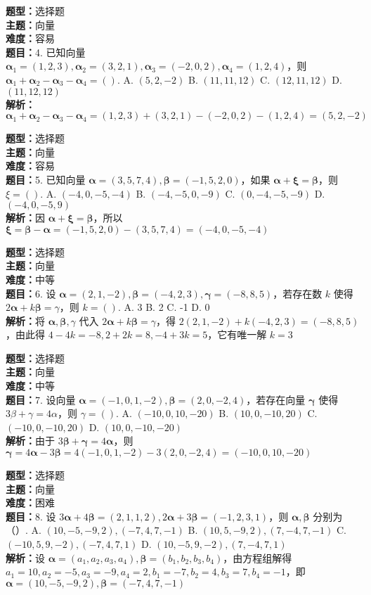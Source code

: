 \documentclass{ctexart}
\newenvironment{question}[5]{%
	\noindent\textbf{题型：}#1\\
	\textbf{主题：}#2\\
	\textbf{难度：}#3\\
	\textbf{题目：}#4\\
	\textbf{解析：}#5\\
	\vspace{1em}
}{}
\begin{document}
	\begin{question}
		{选择题}
		{向量}
		{容易}
		{4. 已知向量 \(\boldsymbol{\alpha}_1=(1,2,3), \boldsymbol{\alpha}_2=(3,2,1), \boldsymbol{\alpha}_3=(-2,0,2), \boldsymbol{\alpha}_4=(1,2,4)\)，则 \(\boldsymbol{\alpha}_1+\boldsymbol{\alpha}_2-\boldsymbol{\alpha}_3-\boldsymbol{\alpha}_4=()\). 
			A. \((5,2,-2)\)
			B. \((11,11,12)\)
			C. \((12,11,12)\)
			D. \((11,12,12)\)}
		{\(\boldsymbol{\alpha}_1+\boldsymbol{\alpha}_2-\boldsymbol{\alpha}_3-\boldsymbol{\alpha}_4=(1,2,3)+(3,2,1)-(-2,0,2)-(1,2,4)=(5,2,-2)\)}
	\end{question}
	
	\begin{question}
		{选择题}
		{向量}
		{容易}
		{5. 已知向量 \(\boldsymbol{\alpha}=(3,5,7,4), \boldsymbol{\beta}=(-1,5,2,0)\)，如果 \(\boldsymbol{\alpha}+\boldsymbol{\xi}=\boldsymbol{\beta}\)，则 \(\xi=()\). 
			A. \((-4,0,-5,-4)\)
			B. \((-4,-5,0,-9)\)
			C. \((0,-4,-5,-9)\)
			D. \((-4,0,-5,9)\)}
		{因 \(\boldsymbol{\alpha}+\boldsymbol{\xi}=\boldsymbol{\beta}\)，所以 \(\boldsymbol{\xi}=\boldsymbol{\beta}-\boldsymbol{\alpha}=(-1,5,2,0)-(3,5,7,4)=(-4,0,-5,-4)\)}
	\end{question}
	
	\begin{question}
		{选择题}
		{向量}
		{中等}
		{6. 设 \(\boldsymbol{\alpha}=(2,1,-2), \boldsymbol{\beta}=(-4,2,3), \boldsymbol{\gamma}=(-8,8,5)\)，若存在数 \(k\) 使得 \(2\boldsymbol{\alpha}+k\boldsymbol{\beta}=\gamma\)，则 \(k=()\). 
			A. 3
			B. 2
			C. -1
			D. 0}
		{将 \(\boldsymbol{\alpha}, \boldsymbol{\beta}, \gamma\) 代入 \(2\boldsymbol{\alpha}+k\boldsymbol{\beta}=\gamma\)，得 \(2(2,1,-2)+k(-4,2,3)=(-8,8,5)\)，由此得 \(4-4k=-8,2+2k=8,-4+3k=5\)，它有唯一解 \(k=3\)}
	\end{question}
	
	\begin{question}
		{选择题}
		{向量}
		{中等}
		{7. 设向量 \(\boldsymbol{\alpha}=(-1,0,1,-2), \boldsymbol{\beta}=(2,0,-2,4)\)，若存在向量 \(\boldsymbol{\gamma}\) 使得 \(3\beta+\gamma=4\alpha\)，则 \(\gamma=()\). 
			A. \((-10,0,10,-20)\)
			B. \((10,0,-10,20)\)
			C. \((-10,0,-10,20)\)
			D. \((10,0,-10,-20)\)}
		{由于 \(3\boldsymbol{\beta}+\boldsymbol{\gamma}=4\boldsymbol{\alpha}\)，则 \(\boldsymbol{\gamma}=4\boldsymbol{\alpha}-3\boldsymbol{\beta}=4(-1,0,1,-2)-3(2,0,-2,4)=(-10,0,10,-20)\)}
	\end{question}
	
	\begin{question}
		{选择题}
		{向量}
		{困难}
		{8. 设 \(3\boldsymbol{\alpha}+4\boldsymbol{\beta}=(2,1,1,2), 2\boldsymbol{\alpha}+3\boldsymbol{\beta}=(-1,2,3,1)\)，则 \(\boldsymbol{\alpha}, \boldsymbol{\beta}\) 分别为（）. 
			A. \((10,-5,-9,2),(-7,4,7,-1)\)
			B. \((10,5,-9,2),(7,-4,7,-1)\)
			C. \((-10,5,9,-2),(-7,4,7,1)\)
			D. \((10,-5,9,-2),(7,-4,7,1)\)}
		{设 \(\boldsymbol{\alpha}=(a_1,a_2,a_3,a_4), \boldsymbol{\beta}=(b_1,b_2,b_3,b_4)\)，由方程组解得 \(a_1=10,a_2=-5,a_3=-9,a_4=2,b_1=-7,b_2=4,b_3=7,b_4=-1\)，即 \(\boldsymbol{\alpha}=(10,-5,-9,2), \boldsymbol{\beta}=(-7,4,7,-1)\)}
	\end{question}
	
\end{document}
